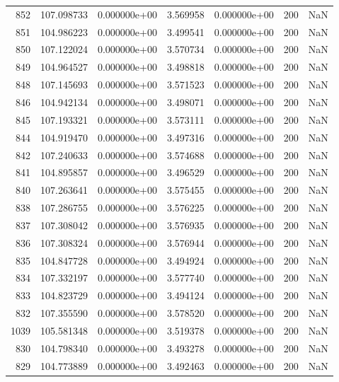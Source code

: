\begin{tabular}{rrrrrrr}
 852 & 107.098733 &  0.000000e+00 &  3.569958 &  0.000000e+00 &         200 & NaN \\
 851 & 104.986223 &  0.000000e+00 &  3.499541 &  0.000000e+00 &         200 & NaN \\
 850 & 107.122024 &  0.000000e+00 &  3.570734 &  0.000000e+00 &         200 & NaN \\
 849 & 104.964527 &  0.000000e+00 &  3.498818 &  0.000000e+00 &         200 & NaN \\
 848 & 107.145693 &  0.000000e+00 &  3.571523 &  0.000000e+00 &         200 & NaN \\
 846 & 104.942134 &  0.000000e+00 &  3.498071 &  0.000000e+00 &         200 & NaN \\
 845 & 107.193321 &  0.000000e+00 &  3.573111 &  0.000000e+00 &         200 & NaN \\
 844 & 104.919470 &  0.000000e+00 &  3.497316 &  0.000000e+00 &         200 & NaN \\
 842 & 107.240633 &  0.000000e+00 &  3.574688 &  0.000000e+00 &         200 & NaN \\
 841 & 104.895857 &  0.000000e+00 &  3.496529 &  0.000000e+00 &         200 & NaN \\
 840 & 107.263641 &  0.000000e+00 &  3.575455 &  0.000000e+00 &         200 & NaN \\
 838 & 107.286755 &  0.000000e+00 &  3.576225 &  0.000000e+00 &         200 & NaN \\
 837 & 107.308042 &  0.000000e+00 &  3.576935 &  0.000000e+00 &         200 & NaN \\
 836 & 107.308324 &  0.000000e+00 &  3.576944 &  0.000000e+00 &         200 & NaN \\
 835 & 104.847728 &  0.000000e+00 &  3.494924 &  0.000000e+00 &         200 & NaN \\
 834 & 107.332197 &  0.000000e+00 &  3.577740 &  0.000000e+00 &         200 & NaN \\
 833 & 104.823729 &  0.000000e+00 &  3.494124 &  0.000000e+00 &         200 & NaN \\
 832 & 107.355590 &  0.000000e+00 &  3.578520 &  0.000000e+00 &         200 & NaN \\
1039 & 105.581348 &  0.000000e+00 &  3.519378 &  0.000000e+00 &         200 & NaN \\
 830 & 104.798340 &  0.000000e+00 &  3.493278 &  0.000000e+00 &         200 & NaN \\
 829 & 104.773889 &  0.000000e+00 &  3.492463 &  0.000000e+00 &         200 & NaN \\

\end{tabular}
